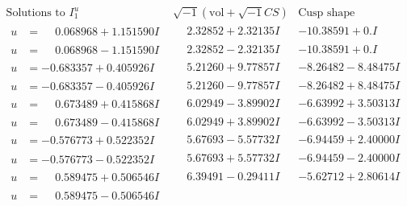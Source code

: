 \documentclass[1p]{elsarticle_modified}
\theoremstyle{definition}
\newcommand{\I}{\sqrt{-1}}
\begin{document}
$$\begin{array}{c|c|c}  
\text{Solutions to }I^u_{1}& \I (\text{vol} + \sqrt{-1}CS) & \text{Cusp shape}\\
 \hline 
\begin{aligned}
u &= \phantom{-}0.068968 + 1.151590 I\end{aligned}
 & \phantom{-}2.32852 + 2.32135 I & -10.38591 + 0. I\phantom{ +0.000000I} \\ \hline\begin{aligned}
u &= \phantom{-}0.068968 - 1.151590 I\end{aligned}
 & \phantom{-}2.32852 - 2.32135 I & -10.38591 + 0. I\phantom{ +0.000000I} \\ \hline\begin{aligned}
u &= -0.683357 + 0.405926 I\end{aligned}
 & \phantom{-}5.21260 + 9.77857 I & -8.26482 - 8.48475 I \\ \hline\begin{aligned}
u &= -0.683357 - 0.405926 I\end{aligned}
 & \phantom{-}5.21260 - 9.77857 I & -8.26482 + 8.48475 I \\ \hline\begin{aligned}
u &= \phantom{-}0.673489 + 0.415868 I\end{aligned}
 & \phantom{-}6.02949 - 3.89902 I & -6.63992 + 3.50313 I \\ \hline\begin{aligned}
u &= \phantom{-}0.673489 - 0.415868 I\end{aligned}
 & \phantom{-}6.02949 + 3.89902 I & -6.63992 - 3.50313 I \\ \hline\begin{aligned}
u &= -0.576773 + 0.522352 I\end{aligned}
 & \phantom{-}5.67693 - 5.57732 I & -6.94459 + 2.40000 I \\ \hline\begin{aligned}
u &= -0.576773 - 0.522352 I\end{aligned}
 & \phantom{-}5.67693 + 5.57732 I & -6.94459 - 2.40000 I \\ \hline\begin{aligned}
u &= \phantom{-}0.589475 + 0.506546 I\end{aligned}
 & \phantom{-}6.39491 - 0.29411 I & -5.62712 + 2.80614 I \\ \hline\begin{aligned}
u &= \phantom{-}0.589475 - 0.506546 I\end{aligned}

\end{array}$$
\end{document}
